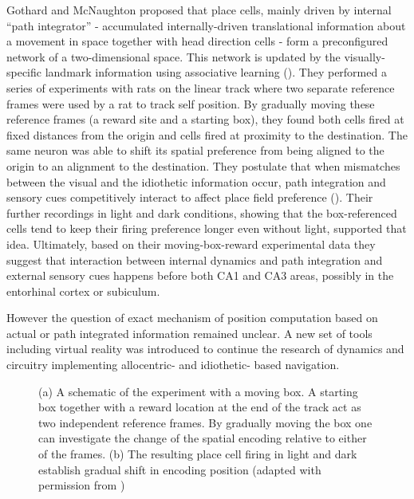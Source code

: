 Gothard and McNaughton proposed that place cells, mainly driven by internal “path integrator” - accumulated internally-driven translational information about a movement in space together with head direction cells - form a preconfigured network of a two-dimensional space. This network is updated by the visually-specific landmark information using associative learning (\cite{Mcnaughton1996}). They performed a series of experiments with rats on the linear track where two separate reference frames were used by a rat to track self position. By gradually moving these reference frames (a reward site and a starting box), they found both cells fired at fixed distances from the origin and cells fired at proximity to the destination. The same neuron was able to shift its spatial preference from being aligned to the origin to an alignment to the destination. They postulate that when mismatches between the visual and the idiothetic information occur, path integration and sensory cues competitively interact to affect place field preference (\cite{Gothard1996}). Their further recordings in light and dark conditions, showing that the box-referenced cells tend to keep their firing preference longer even without light, supported that idea. Ultimately, based on their moving-box-reward experimental data they suggest that interaction between internal dynamics and path integration and external sensory cues happens before both CA1 and CA3 areas, possibly in the entorhinal cortex or subiculum.

However the question of exact mechanism of position computation based on actual or path integrated information remained unclear. A new set of tools including virtual reality was introduced to continue the research of dynamics and circuitry implementing allocentric- and idiothetic- based navigation.


\begin{figure}
\captionsetup{format=plain}
\caption[Moving shelter as a reference frame]{
(a) A schematic of the experiment with a moving box. A starting box together with a reward location at the end of the track act as two independent reference frames. By gradually moving the box one can investigate the change of the spatial encoding relative to either of the frames. (b) The resulting place cell firing in light and dark establish gradual shift in encoding position (adapted with permission from \cite{McNaughton2006})
}
\label{fig:F4_moving_box}
\end{figure}


